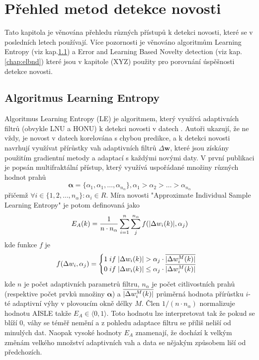 \chapter{Přehled metod detekce novosti}
Tato kapitola je věnována přehledu různých přístupů k detekci novosti, které se v posledních letech používají. Více pozornosti je věnováno algoritmům Learning Entropy (viz kap.\ref{chap:LE}) a Error and Learning Based Novelty detection (viz kap. \ref{chap:elbnd}) které jsou v kapitole (XYZ) použity pro porovnání úspěšnosti detekce novosti.
\section{Algoritmus Learning Entropy}\label{chap:LE}
Algoritmus Learning Entropy (LE) je algoritmem, který využívá adaptivních filtrů (obvykle LNU a HONU) k detekci novosti v datech \cite{ivoLE1,ivoLE2}. Autoři ukazují, že ne vždy, je novost v datech korelována s chybou predikce, a k detekci novosti navrhují využívat přírůstky vah adaptivních filtrů $\Delta\textbf{w}$, které jsou získány použitím gradientní metody a adaptací s každými novými daty. V první publikaci \cite{ivoLE1} je popsán multifraktální přístup, který využívá uspořádané množiny různých hodnot prahů
\begin{equation}
\boldsymbol{\alpha}=\{ \alpha_1,\alpha_1,\dots,\alpha_{n_{\alpha}} \}, \alpha_1>\alpha_2>\dots>\alpha_{n_{\alpha}}
\end{equation}
přičemž $\forall i \in \{1,2,\dots,n_{\alpha} \}:\alpha_i\in R$. Míra novosti "Approximate Individual Sample Learning Entropy" je potom definovaná jako
\begin{equation}\label{eq:aisle}
E_A(k)=\frac{1}{n\cdot n_{\alpha}}\sum_{i=1}^{n}\sum_j^{n_{\alpha}} f(\lvert\Delta w_i(k)\rvert, \alpha_j)
\end{equation}
kde funkce $f$ je
\begin{equation}
f(\Delta w_i, \alpha_j)=\begin{cases}
1 \; if \; \lvert\Delta w_i(k)\rvert>\alpha_{j} \cdot \overline{\lvert\Delta w_i^M(k)\rvert}\\
0 \; if \; \lvert\Delta w_i(k)\rvert\leq \alpha_j \cdot \overline{\lvert\Delta w_i^M(k)\rvert}


\end{cases}
\end{equation}
kde $n$ je počet adaptivních parametrů filtru, $n_{\alpha}$ je počet citlivostních prahů (respektive počet prvků množiny $\boldsymbol{\alpha}$) a $\overline{\lvert\Delta w_i^M(k)\rvert}$ průměrná hodnota přírůstku $i$-té adaptivní výhy v plovoucím okně délky $M$. Člen $1/(n\cdot n_{\alpha})$ normalizuje hodnotu AISLE takže  $E_A \in \langle 0,1\rangle$. Toto hodnotu lze interpretovat tak že pokud se blíží 0, váhy se téměř nemění a z pohledu adaptace filtru se příliš neliší od minulých dat. Naopak vysoké hodnoty $E_A$ znamenají, že dochází k velkým změnám velkého množství adaptivních vah a data se nějakým způsobem liší od předchozích. 
